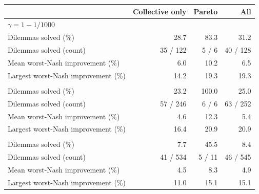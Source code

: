 \begin{tabular}{lrrr}
\toprule
 & \textbf{Collective only} & \textbf{Pareto} & \textbf{All} \\
\midrule
\multicolumn{4}{l}{$\gamma = 1-1/1000$} \\
Dilemmas solved (\%) & 28.7 & 83.3 & 31.2 \\
Dilemmas solved (count) & 35 / 122 & 5 / 6 & 40 / 128 \\
Mean worst-Nash improvement (\%) & 6.0 & 10.2 & 6.5 \\
Largest worst-Nash improvement (\%) & 14.2 & 19.3 & 19.3 \\
\addlinespace
\multicolumn{4}{l}{$\gamma = 1-1/5000$} \\
Dilemmas solved (\%) & 23.2 & 100.0 & 25.0 \\
Dilemmas solved (count) & 57 / 246 & 6 / 6 & 63 / 252 \\
Mean worst-Nash improvement (\%) & 4.6 & 12.3 & 5.4 \\
Largest worst-Nash improvement (\%) & 16.4 & 20.9 & 20.9 \\
\addlinespace
\multicolumn{4}{l}{$\gamma = 1-1/100000$} \\
Dilemmas solved (\%) & 7.7 & 45.5 & 8.4 \\
Dilemmas solved (count) & 41 / 534 & 5 / 11 & 46 / 545 \\
Mean worst-Nash improvement (\%) & 4.5 & 8.3 & 4.9 \\
Largest worst-Nash improvement (\%) & 11.0 & 15.1 & 15.1 \\
\bottomrule
\end{tabular}
